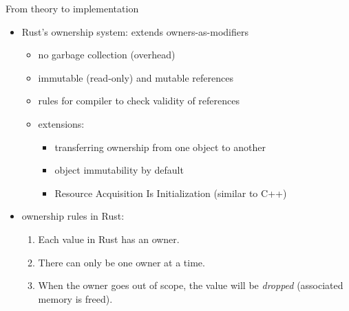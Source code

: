 \documentclass{beamer}
\begin{document}
\begin{frame}{From theory to implementation}
\begin{itemize}
  \item Rust's ownership system: extends owners-as-modifiers
  \begin{itemize}
    \item no garbage collection (overhead)
    \item immutable (read-only) and mutable references %
    \item rules for compiler to check validity of references
    \item extensions:
    \begin{itemize}
      \item transferring ownership from one object to another
      \item object immutability by default
      \item Resource Acquisition Is Initialization (similar to C++)
    \end{itemize}
  \end{itemize}
  \item ownership rules in Rust:
  \begin{enumerate}
    \item Each value in Rust has an owner.
    \item There can only be one owner at a time.
    \item When the owner goes out of scope, the value will be \emph{dropped} (associated memory is freed).
  \end{enumerate}
\end{itemize}
\end{frame}



\end{document}
